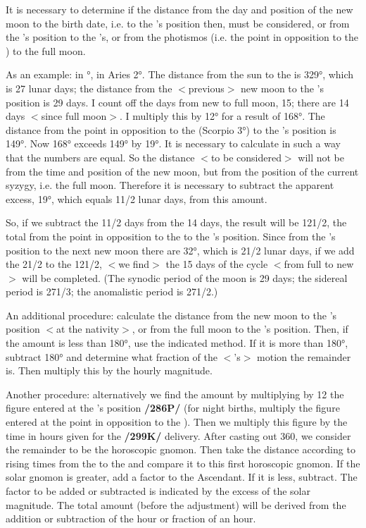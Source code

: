 It is necessary to determine if the distance from the day and position of
the new moon to the birth date, i.e. to the \Moon’s position then, must be considered, or from the \Sun’s position to the \Moon’s, or from the photismos (i.e. the point in opposition to the \Sun) to the full moon.

As an example: \Sun\xspace in \Taurus\xspace 3°, \Moon\xspace in Aries 2°. The distance from the sun to the \Moon\xspace is 329°, which is 27 lunar days; the distance from the $<$previous$>$ new moon to the \Moon’s position is 29 days. I count off the days from new to full moon, 15; there are 14 days $<$since full moon$>$. I multiply this by 12°
for a result of 168°. The distance from the point in opposition to the \Sun\xspace (Scorpio 3°) to the \Moon’s position is 149°. Now 168° exceeds 149° by 19°. It is necessary to calculate in such a way that the
numbers are equal. So the distance $<$to be considered$>$ will not be from the time and position of the new moon, but from the position of the current syzygy, i.e. the full moon. Therefore it is necessary to subtract the apparent excess, 19°, which equals 11/2 lunar days, from this amount. 

So, if we subtract the 11/2 days from the 14 days, the result will be 121/2, the total from the point in opposition to the \Sun\xspace to the \Moon’s position. Since from the \Moon’s position to the next new moon there are 32°, which is 21/2 lunar days, if we add the 21/2 to the 121/2, $<$we find$>$ the 15 days of the cycle $<$from full to new$>$ will be completed. (The synodic period of the moon is 29 days; the sidereal period is 271/3; the anomalistic period is 271/2.)

An additional procedure: calculate the distance from the new moon to the \Moon’s position $<$at the nativity$>$, or from the full moon to the \Moon’s position. Then, if the amount is less than 180°, use the
indicated method. If it is more than 180°, subtract 180° and determine what fraction of the $<$\Moon’s$>$ motion the remainder is. Then multiply this by the hourly magnitude.

Another procedure: alternatively we find the amount by multiplying by 12 the figure entered at the \Sun’s position \textbf{/286P/} (for night births, multiply the figure entered at the point in opposition to the \Sun). Then we multiply this figure by the time in hours given for the \textbf{/299K/} delivery. After casting out 360, we consider the remainder to be the horoscopic gnomon. Then take the distance according to rising times from the \Sun\xspace to the \Moon\xspace and compare it to this first horoscopic gnomon. If the solar gnomon is greater, add a factor to the Ascendant. If it is less, subtract. The factor to be added or subtracted is indicated by the excess of the solar magnitude. The total amount (before the adjustment) will be derived from the addition or subtraction of the hour or fraction of an hour.

\newpage